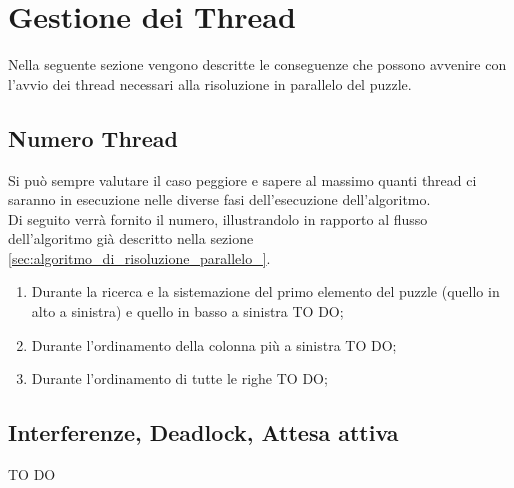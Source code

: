 % 
%
%

\section{Gestione dei Thread} %
\label{sec:gestione_dei_thread}
Nella seguente sezione vengono descritte le conseguenze che possono avvenire con l'avvio dei thread necessari alla risoluzione in parallelo del puzzle.

	\subsection{Numero Thread} %
	\label{sub:numero_thread}
	Si può sempre valutare il caso peggiore e sapere al massimo quanti thread ci saranno in esecuzione nelle diverse fasi dell'esecuzione dell'algoritmo. \\
	Di seguito verrà fornito il numero, illustrandolo in rapporto al flusso dell'algoritmo già descritto nella sezione \ref{sec:algoritmo_di_risoluzione_parallelo_}.
		\begin{enumerate}
			\item Durante la ricerca e la sistemazione del primo elemento del puzzle (quello in alto a sinistra) e quello in basso a sinistra TO DO;
			\item Durante l'ordinamento della colonna più a sinistra TO DO;
			\item Durante l'ordinamento di tutte le righe TO DO;
		\end{enumerate}
	
	\subsection{Interferenze, Deadlock, Attesa attiva} %
	\label{sub:interferenze_deadlock_attesa_attiva}
	TO DO
	



